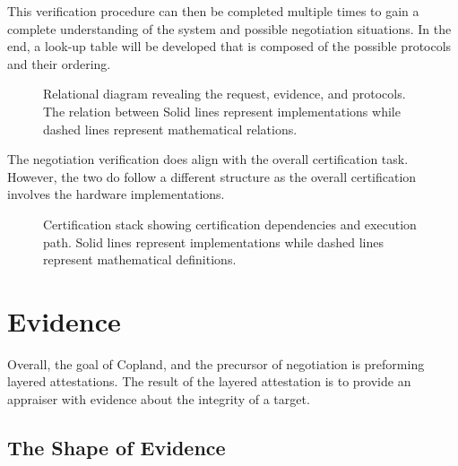 \documentclass[10pt]{report}
\begin{document}
This verification procedure can then be completed multiple times to gain
a complete understanding of the system and possible negotiation situations.
In the end, a look-up table will be developed that is composed of the possible
protocols and their ordering. 

\begin{figure}[hbtp]
  \centering
  
  \caption[Relational Figure]{ Relational diagram revealing the request,
    evidence, and protocols. The relation between  Solid lines
    represent implementations while dashed lines represent
    mathematical relations.}
  \label{fig:certification-fig}
\end{figure}

The negotiation verification does align with the overall certification task.
However, the two do follow a different structure as the overall certification
involves the hardware implementations. 


\begin{figure}[hbtp]
  \centering
  
  \caption[Certification Figure]{Certification stack showing
    certification dependencies and execution path. Solid lines
    represent implementations while dashed lines represent
    mathematical definitions.}
  \label{fig:certification-fig}
\end{figure}

\section {Evidence}

Overall, the goal of Copland, and the precursor of negotiation is preforming
layered attestations.  The result of the layered attestation is to provide
an appraiser with evidence about the integrity of a target. 

\subsection {The Shape of Evidence}
\end{document}

